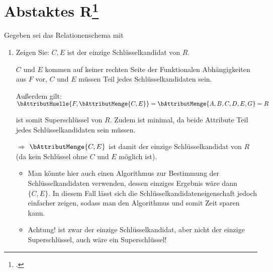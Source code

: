 \documentclass{bschlangaul-aufgabe}
\begin{document}
\let\ah=\bAttributHuelle
\let\fa=\bFunktionaleAbhaengigkeit
\let\FA=\bFunktionaleAbhaengigkeiten
\let\m=\bAttributMenge


\section{Abstaktes R\footcite[Seite 1, Aufgabe 1]{db:ab:6}}

Gegeben sei das Relationenschema  mit

\FA[F]{
  E -> D;
  C -> B;
  C, E -> G;
  B -> A;
}

\begin{enumerate}


\item Zeigen Sie: ${C, E}$ ist der einzige Schlüsselkandidat von $R$.

\begin{bAntwort}
$C$ und $E$ kommen auf keiner rechten Seite der Funktionalen
Abhängigkeiten aus $F$ vor, \dh $C$ und $E$ müssen Teil jedes
Schlüsselkandidaten sein.

Außerdem gilt: $\ah{F, \m{C, E}} = \m{A, B, C, D, E, G} = R$

\m{C, E} ist somit Superschlüssel von $R$. Zudem ist \m{C, E}
minimal, da beide Attribute Teil jedes Schlüsselkandidaten sein müssen.

$\Rightarrow$ $\m{C, E}$ ist damit der einzige Schlüsselkandidat von $R$
(da kein Schlüssel ohne $C$ und $E$ möglich ist).


\begin{itemize}
\item Man könnte hier auch einen Algorithmus zur Bestimmung der
Schlüsselkandidaten verwenden, dessen einziges Ergebnis wäre dann $\{C,
E\}$. In diesem Fall lässt sich die Schlüsselkandidateneigenschaft
jedoch einfacher zeigen, sodass man den Algorithmus und somit Zeit
sparen kann.

\item Achtung! \m{C, E} ist zwar der einzige Schlüsselkandidat, aber
nicht der einzige Superschlüssel, auch \m{A, B, C, D, E, G} wäre ein
Superschlüssel!
\end{itemize}

\end{bAntwort}



\end{enumerate}
\end{document}
